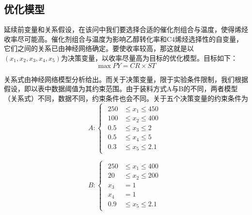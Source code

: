 \documentclass{article}
\begin{document}
	\subsection{优化模型}
	延续前变量和关系假设，在该问中我们要选择合适的催化剂组合与温度，使得烯烃收率尽可能高。催化剂组合与温度为影响乙醇转化率和C4烯烃选择性的自变量，它们之间的关系已由神经网络确定。要使收率较高，那这就是以$(x_1,x_2,x_3,x_4,x_5)$为决策变量，以收率尽量高为目标的优化模型。目标如下：
	\begin{equation}
		\max PY=CR\times ST
	\end{equation}

	关系式由神经网络模型分析给出。而关于决策变量，限于实验条件限制，我们根据假设，即以表中数据阈值为其约束范围。由于装料方式A与B的不同，两者模型（关系式）不同，数据不同，约束条件也会不同。关于五个决策变量的约束条件为
	\begin{equation}
		A:\left\{\begin{array}{l}
			\begin{aligned}
				250&\leq x_1\leq 450 \\
				100&\leq x_2\leq 400 \\
				0.5&\leq x_3\leq 2\\
				0.5&\leq x_4\leq 5\\
				0.3&\leq x_5\leq2.1
			\end{aligned}
		\end{array}\right.
	\end{equation}

	\begin{equation}
		B:\left\{\begin{array}{l}
			\begin{aligned}
				250&\leq x_1\leq 400 \\
				20&\leq x_2\leq 200 \\
				x_3&=1\\
				x_4&=1\\
				0.9&\leq x_5\leq2.1
			\end{aligned}
		\end{array}\right.
	\end{equation}
	
\end{document}
